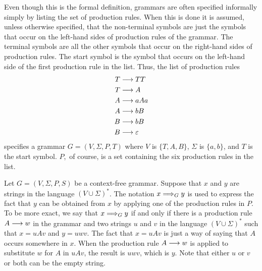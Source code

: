 Even though this is the formal definition, grammars are often
specified informally simply by listing the set of production rules.
When this is done it is assumed, unless otherwise specified,
that the non-terminal symbols are just the symbols that occur
on the left-hand sides of production rules of the grammar.
The terminal symbols are all the other symbols that occur on
the right-hand sides of production rules.  The start symbol is the
symbol that occurs on the left-hand side of the first production
rule in the list.  Thus, the list of production rules
\begin{align*}
   T&\longrightarrow TT\\
   T&\longrightarrow A\\
   A&\longrightarrow aAa\\
   A&\longrightarrow bB\\
   B&\longrightarrow bB\\
   B&\longrightarrow \varepsilon 
\end{align*}
specifies a grammar $G=(V,\Sigma,P,T)$ where $V$ is $\{T,A,B\}$,
$\Sigma$ is $\{a,b\}$, and $T$ is the start symbol.  $P$,~of course, is a
set containing the six production rules in the list.


Let $G=(V,\Sigma,P,S)$ be a context-free grammar.
Suppose that $x$ and $y$ are strings in the language $(V\cup\Sigma)^*$.
The notation $x\Longrightarrow_G y$ is used to express the fact
that $y$ can be obtained from $x$ by applying one of the production
rules in $P$.  To be more exact, we say that $x\Longrightarrow_G y$
if and only if there is a production rule $A\longrightarrow w$ in the grammar
and two strings $u$ and $v$ in the language $(V\cup\Sigma)^*$
such that $x=uAv$ and $y=uwv$. The fact
that $x=uAv$ is just a way of saying that $A$ occurs somewhere in
$x$.  When the production rule $A\longrightarrow w$ is applied to
substitute $w$ for $A$ in $uAv$, the result is $uwv$, which is $y$.
Note that either $u$ or $v$ or both can be the empty string.

